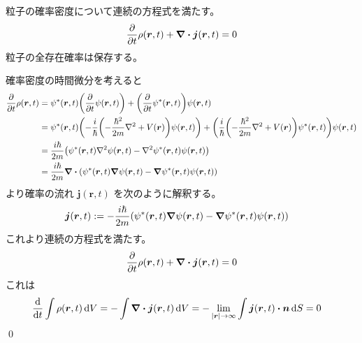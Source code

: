 \documentclass[uplatex,dvipdfmx,a4paper,11pt]{jlreq}
\makeatletter
\newcommand{\rr}{\bm{r}}
\numberwithin{equation}{section}
\theoremstyle{definition}
\renewenvironment{proof}[1][\proofname]{\par
  \normalfont
  \topsep6\p@\@plus6\p@ \trivlist
  \item[\hskip\labelsep{\bfseries #1}\@addpunct{\bfseries}]\ignorespaces\quad\par
}{%
  \qed\endtrivlist\@endpefalse
}
\renewcommand\proofname{証明}
\makeatother
\begin{document}
\begin{theorem}
  粒子の確率密度について連続の方程式を満たす。
  \begin{align}
    \diffp{}{t}\rho(\rr, t) + \vnabla\vdot\bm{j}(\rr, t) = 0
  \end{align}
  粒子の全存在確率は保存する。
\end{theorem}
\begin{proof}
  確率密度の時間微分を考えると
  \begin{align}
    \diffp{}{t}\rho(\rr, t) & = \psi^*(\rr, t)\qty(\diffp{}{t}\psi(\rr, t)) + \qty(\diffp{}{t}\psi^*(\rr, t))\psi(\rr, t)                                                                                              \\
                            & = \psi^*(\rr, t)\qty(-\frac{i}{\hbar}\qty(-\frac{\hbar^2}{2m}\nabla^2 + V(\rr))\psi(\rr, t)) + \qty(\frac{i}{\hbar}\qty(-\frac{\hbar^2}{2m}\nabla^2 + V(\rr))\psi^*(\rr, t))\psi(\rr, t) \\
                            & = \frac{i\hbar}{2m}\qty(\psi^*(\rr, t)\nabla^2\psi(\rr, t) - \nabla^2\psi^*(\rr, t)\psi(\rr, t))                                                                                         \\
                            & = \frac{i\hbar}{2m}\vnabla\vdot\qty(\psi^*(\rr, t)\vnabla\psi(\rr, t) - \vnabla\psi^*(\rr, t)\psi(\rr, t))
  \end{align}
  より確率の流れ $\bm{j}(\rr, t)$ を次のように解釈する。
  \begin{align}
    \bm{j}(\rr, t) & := -\frac{i\hbar}{2m}\qty(\psi^*(\rr, t)\vnabla\psi(\rr, t) - \vnabla\psi^*(\rr, t)\psi(\rr, t))
  \end{align}
  これより連続の方程式を満たす。
  \begin{align}
    \diffp{}{t}\rho(\rr, t) + \vnabla\vdot\bm{j}(\rr, t) = 0
  \end{align}
  これは
  \begin{align}
    \dv{t}\int\rho(\rr, t)\dd{V} & = -\int\vnabla\vdot\bm{j}(\rr, t)\dd{V} = -\lim_{|\rr|\to\infty}\int\bm{j}(\rr, t)\vdot\bm{n}\dd{S} = 0
  \end{align}
\end{proof}
\end{document}

